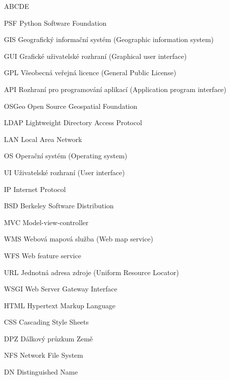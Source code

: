 
\begin{seznamzkratek}{ABCDE}      
	      
		  {PSF}
	      {Python Software Foundation}

	      {GIS}
	      {Geografický informační systém (Geographic information system)}
	         
	      {GUI}
	      {Grafické uživatelské rozhraní (Graphical user interface)}

	      {GPL}
	      {Všeobecná veřejná licence (General Public License)}
	      
	      {API}
	      {Rozhraní pro programování aplikací (Application program interface)}	      
	    
	      {OSGeo}
	      {Open Source Geospatial Foundation}
	      
	      {LDAP}
	      {Lightweight Directory Access Protocol} 
	      
	      {LAN}
	      {Local Area Network} 
	      	       
	      {OS}
	      {Operační systém (Operating system)} 

	      {UI}
	      {Uživatelské rozhraní (User interface)} 
	      
	      {IP}
	      {Internet Protocol} 	      	     

	      {BSD}
	      {Berkeley Software Distribution} 	

	      {MVC}
	      {Model-view-controller} 	

	      {WMS}
	      {Webová mapová služba (Web map service)} 	

	      {WFS}
	      {Web feature service} 	

	      {URL}
	      {Jednotná adresa zdroje (Uniform Resource Locator)}

	      {WSGI}
	      {Web Server Gateway Interface}

	      {HTML}
	      {Hypertext Markup Language}

	      {CSS}
	      {Cascading Style Sheets}

	      {DPZ}
	      {Dálkový průzkum Země}

	      {NFS}
	      {Network File System}
	      
	      {DN}
	      {Distinguished Name}
	      	      
\end{seznamzkratek}